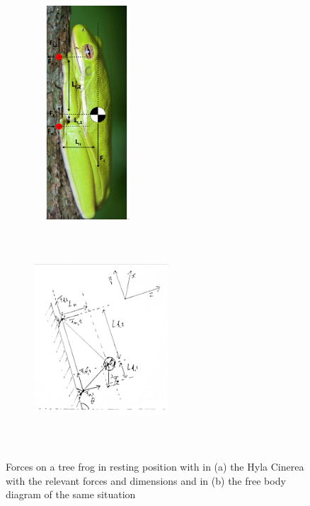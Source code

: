 \begin{figure}[h]
\begin{subfigure}{0.24\textwidth}
\includegraphics[width=4cm, height=8cm,angle=0]{images/limb spreading/tree_frog_forces_vertical.PNG}
\caption{}
\label{fig:tree_frog_with_forces}
\end{subfigure}
\hspace{0.8in}
\begin{subfigure}{0.24\textwidth}
\includegraphics[width=5cm, height=8cm, angle=0]{images/limb spreading/FBD_frog_angle.jpg}
\caption{}
\label{fig:FBD_2D}
\end{subfigure}
\caption{Forces on a tree frog in resting position with in (a) the Hyla Cinerea with the relevant forces and dimensions and in (b) the free body diagram of the same situation}
\label{fig:FBD_tree_frog}
\end{figure}

